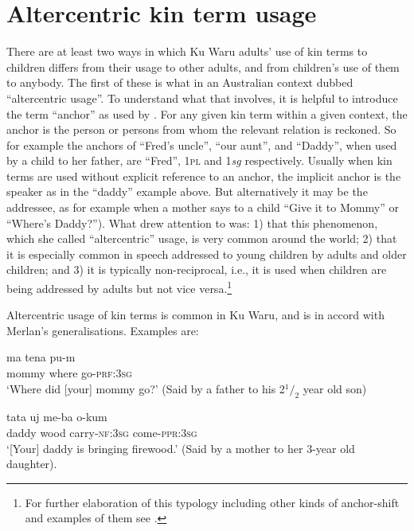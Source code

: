 \documentclass[output=paper]{langsci/langscibook}
\begin{document}
\section{Altercentric kin term usage}\label{s:ar3}

There are at least two ways in which Ku Waru adults’ use of kin terms to children differs from their usage to other adults, and from children’s use of them to anybody. The first of these is what \cite{Merlan1982} in an Australian context dubbed “altercentric usage”. To understand what that involves, it is helpful to introduce the term “anchor” as used by \cite{DahlK-T2001}. For any given kin term within a given context, the anchor is the person or persons from whom the relevant relation is reckoned. So for example the anchors of “Fred’s uncle”, “our aunt”,  and “Daddy”, when used by a child to her father, are “Fred”, 1\textsc{pl} and 1\textit{sg}  respectively. Usually when kin terms are used without explicit reference to an anchor, the implicit anchor is the speaker as in the “daddy” example above. But alternatively it may be the addressee, as for example when a mother says to a child “Give it to Mommy” or “Where’s Daddy?”). What \cite{Merlan1982} drew attention to was: 1) that this phenomenon, which she called “altercentric” usage, is very common around the world; 2) that it is especially common in speech addressed to young children by adults and older children; and 3) it is typically non-reciprocal, i.e., it is used when children are being addressed by adults but not vice versa.\footnote{For further elaboration of this typology including other kinds of anchor-shift and examples of them see \cite{Agha2006}.} 

Altercentric usage of kin terms is common in Ku Waru, and is in accord with Merlan’s generalisations. Examples are:

\begin{exe}
	\ex \label{ex:ar17}
	\gll ma tena pu-m\\
	mommy where	go-\textsc{prf}:3\textsc{sg}\\
	\trans ‘Where did [your] mommy go?’  (Said by a father to his 2$^1/_2$ year old son)
\end{exe}

\begin{exe}
	\ex \label{ex:ar18}
	\gll tata uj me-ba o-kum\\
	daddy wood carry-\textsc{nf}:3\textsc{sg} come-\textsc{ppr}:3\textsc{sg}\\
	\trans ‘[Your] daddy is bringing firewood.’ (Said by a mother to her 3-year old daughter).
\end{exe}
\end{document}

